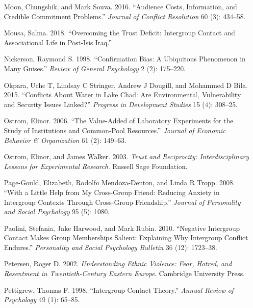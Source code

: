 \documentclass[11pt]{article}
\begin{document}
\leavevmode\hypertarget{ref-moon2016audience}{}%
Moon, Chungshik, and Mark Souva. 2016. ``Audience Costs, Information,
and Credible Commitment Problems.'' \emph{Journal of Conflict
Resolution} 60 (3): 434--58.

\leavevmode\hypertarget{ref-mousa2018overcome}{}%
Mousa, Salma. 2018. ``Overcoming the Trust Deficit: Intergroup Contact
and Associational Life in Post-Isis Iraq.''

\leavevmode\hypertarget{ref-nickerson1998confirmation}{}%
Nickerson, Raymond S. 1998. ``Confirmation Bias: A Ubiquitous Phenomenon
in Many Guises.'' \emph{Review of General Psychology} 2 (2): 175--220.

\leavevmode\hypertarget{ref-okpara2015conflicts}{}%
Okpara, Uche T, Lindsay C Stringer, Andrew J Dougill, and Mohammed D
Bila. 2015. ``Conflicts About Water in Lake Chad: Are Environmental,
Vulnerability and Security Issues Linked?'' \emph{Progress in
Development Studies} 15 (4): 308--25.

\leavevmode\hypertarget{ref-ostrom2006value}{}%
Ostrom, Elinor. 2006. ``The Value-Added of Laboratory Experiments for
the Study of Institutions and Common-Pool Resources.'' \emph{Journal of
Economic Behavior \& Organization} 61 (2): 149--63.

\leavevmode\hypertarget{ref-ostrom2003trust}{}%
Ostrom, Elinor, and James Walker. 2003. \emph{Trust and Reciprocity:
Interdisciplinary Lessons for Experimental Research}. Russell Sage
Foundation.

\leavevmode\hypertarget{ref-page2008little}{}%
Page-Gould, Elizabeth, Rodolfo Mendoza-Denton, and Linda R Tropp. 2008.
``With a Little Help from My Cross-Group Friend: Reducing Anxiety in
Intergroup Contexts Through Cross-Group Friendship.'' \emph{Journal of
Personality and Social Psychology} 95 (5): 1080.

\leavevmode\hypertarget{ref-paolini2010negative}{}%
Paolini, Stefania, Jake Harwood, and Mark Rubin. 2010. ``Negative
Intergroup Contact Makes Group Memberships Salient: Explaining Why
Intergroup Conflict Endures.'' \emph{Personality and Social Psychology
Bulletin} 36 (12): 1723--38.

\leavevmode\hypertarget{ref-petersen2002understanding}{}%
Petersen, Roger D. 2002. \emph{Understanding Ethnic Violence: Fear,
Hatred, and Resentment in Twentieth-Century Eastern Europe}. Cambridge
University Press.

\leavevmode\hypertarget{ref-pettigrew1998intergroup}{}%
Pettigrew, Thomas F. 1998. ``Intergroup Contact Theory.'' \emph{Annual
Review of Psychology} 49 (1): 65--85.
\end{document}
